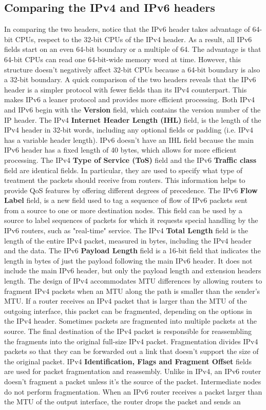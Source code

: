 \documentclass[11pt]{article}
\begin{document}
\subsection{Comparing the IPv4 and IPv6 headers}
In comparing the two headers, notice that the IPv6 header takes advantage of 64-bit CPUs, respect to the 32-bit CPUs of the IPv4 header. As a result, all IPv6 fields start on an even 64-bit boundary or a multiple of 64. The advantage is that 64-bit CPUs can read one 64-bit-wide memory word at time. However, this structure doesn't negatively affect 32-bit CPUs because a 64-bit boundary is also a 32-bit boundary. A quick comparison of the two headers reveals that the IPv6 header is a simpler protocol with fewer fields than its IPv4 counterpart. This makes IPv6 a leaner protocol and provides more efficient processing. Both IPv4 and IPv6 begin with the \textbf{Version} field, which contains the version number of the IP header. The IPv4 \textbf{Internet Header Length (IHL)} field, is the length of the IPv4 header in 32-bit words, including any optional fields or padding (i.e. IPv4 has a variable header length). IPv6 doesn't have an IHL field because the main IPv6 header has a fixed length of 40 bytes, which allows for more efficient processing. The IPv4 \textbf{Type of Service (ToS)} field and the IPv6 \textbf{Traffic class} field are identical fields. In particular, they are used to specify what type of treatment the packets should receive from routers. This information helps to provide QoS features by offering different degrees of precedence. The IPv6 \textbf{Flow Label} field, is a new field used to tag a sequence of flow of IPv6 packets sent from a source to one or more destination nodes. This field can be used by a source to label sequences of packets for which it requests special handling by the IPv6 routers, such as "real-time" service. The IPv4 \textbf{Total Length} field is the length of the entire IPv4 packet, measured in bytes, including the IPv4 header and the data. The IPv6 \textbf{Payload Length} field is a 16-bit field that indicates the length in bytes of just the payload following the main IPv6 header. It does not include the main IPv6 header, but only the payload length and extension headers length. The design of IPv4 accommodates MTU differences by allowing routers to fragment IPv4 packets when an MTU along the path is smaller than the sender's MTU. If a router receives an IPv4 packet that is larger than the MTU of the outgoing interface, this packet can be fragmented, depending on the options in the IPv4 header. Sometimes packets are fragmented into multiple packets at the source. The final destination of the IPv4 packet is responsible for reassembling the fragments into the original full-size IPv4 packet. Fragmentation divides IPv4 packets so that they can be forwarded out a link that doesn't support the size of the original packet. IPv4 \textbf{Identification, Flags and Fragment Offset} fields are used for packet fragmentation and reassembly. Unlike in IPv4, an IPv6 router doesn't fragment a packet unless it's the source of the packet. Intermediate nodes do not perform fragmentation. When an IPv6 router receives a packet larger than the MTU of the output interface, the router drops the packet and sends an 
\end{document}
